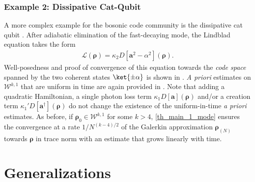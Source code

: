 \documentclass{article}
\newcommand{\xL}{\mathcal{L}}
\newcommand{\xW}{\mathcal{W}}
\newcommand{\rN}{{\boldsymbol{\rho}_{(N)}}}
\let\bf\boldsymbol
\newcommand{\orho}{{\bf \rho}}
\newcommand{\oa}{{\bf a}}
\begin{document}
\subsubsection{Example 2: Dissipative Cat-Qubit}
A more complex example for the bosonic code community is the dissipative cat qubit \cite{mirrahimiDynamicallyProtectedCatqubits2014}. After adiabatic elimination of the fast-decaying mode, the Lindblad equation takes the form
\begin{align}
    \xL(\orho) = \kappa_2 D[\oa^2 - \alpha^2](\orho).
\end{align}
Well-posedness and proof of convergence of this equation towards the \textit{code space} spanned by the two coherent states $\ket{\pm \alpha}$ is shown in \cite{azouitWellposednessConvergenceLindblad2016}. \textit{A priori} estimates on $\xW^{k,1}$ that are uniform in time are again provided in \cite[Section 4.2]{gondolfEnergyPreservingEvolutions2024}. Note that adding a quadratic Hamiltonian, a single photon loss term $\kappa_1 D[\oa](\orho)$ and/or a creation term $\kappa_1' D[\oa^\dag](\orho)$ do not change the existence of the uniform-in-time \textit{a priori} estimates. As before, if $\orho_0 \in \xW^{k,1}$ for some $k>4$, \cref{th_main_1_mode} ensures the convergence at a rate $1/N^{(k-4)/2}$ of the Galerkin approximation $\rN$ towards $\orho$ in trace norm with an estimate that grows linearly with time.

\section{Generalizations}
\label{sec_generalization}
\end{document}
